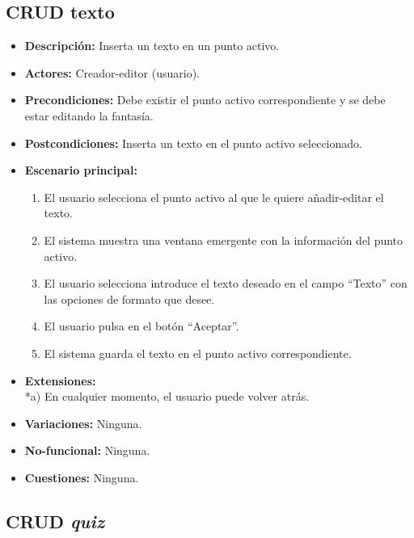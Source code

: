 \subsection{CRUD texto}
\begin{itemize}
	\item \textbf{Descripción:} Inserta un texto en un punto activo.
	\item \textbf{Actores:} Creador-editor (usuario).
	\item \textbf{Precondiciones:} Debe existir el punto activo correspondiente y se debe estar editando la fantasía.
	\item \textbf{Postcondiciones:} Inserta un texto en el punto activo seleccionado.
	\item \textbf{Escenario principal:}
	\begin{enumerate}
		\item El usuario selecciona el punto activo al que le quiere añadir-editar el texto.
		\item El sistema muestra una ventana emergente con la información del punto activo.
		\item El usuario selecciona introduce el texto deseado en el campo ``Texto'' con las opciones de formato que desee. 
		\item El usuario pulsa en el botón ``Aceptar''.
		\item El sistema guarda el texto en el punto activo correspondiente.
	\end{enumerate}
	\item \textbf{Extensiones:} \\ *a) En cualquier momento, el usuario puede volver atrás.
	\item \textbf{Variaciones:} Ninguna.
	\item \textbf{No-funcional:} Ninguna.
	\item \textbf{Cuestiones:} Ninguna.
\end{itemize}

\subsection{CRUD \textit{quiz}}
\hypertarget{crearquiz}{}
